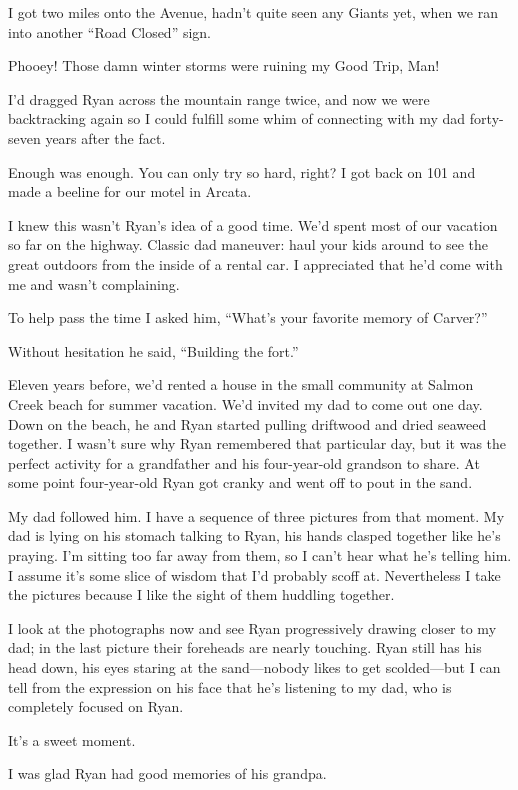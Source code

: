 \documentclass[12pt]{book}
\begin{document}
I got two miles onto the Avenue, hadn't quite seen any Giants yet, when we ran into another ``Road Closed'' sign.

Phooey! Those damn winter storms were ruining my Good Trip, Man!

I'd dragged Ryan across the mountain range twice, and now we were backtracking again so I could fulfill some whim of connecting with my dad forty-seven years after the fact.

Enough was enough. You can only try so hard, right? I got back on 101 and made a beeline for our motel in Arcata.

I knew this wasn't Ryan's idea of a good time. We'd spent most of our vacation so far on the highway. Classic dad maneuver: haul your kids around to see the great outdoors from the inside of a rental car. I appreciated that he'd come with me and wasn't complaining.

To help pass the time I asked him, ``What's your favorite memory of Carver?''

Without hesitation he said, ``Building the fort.''

Eleven years before, we'd rented a house in the small community at Salmon Creek beach for summer vacation. We'd invited my dad to come out one day. Down on the beach, he and Ryan started pulling driftwood and dried seaweed together. I wasn't sure why Ryan remembered that particular day, but it was the perfect activity for a grandfather and his four-year-old grandson to share. At some point four-year-old Ryan got cranky and went off to pout in the sand.

My dad followed him. I have a sequence of three pictures from that moment. My dad is lying on his stomach talking to Ryan, his hands clasped together like he's praying. I'm sitting too far away from them, so I can't hear what he's telling him. I assume it's some slice of wisdom that I'd probably scoff at. Nevertheless I take the pictures because I like the sight of them huddling together.

I look at the photographs now and see Ryan progressively drawing closer to my dad; in the last picture their foreheads are nearly touching. Ryan still has his head down, his eyes staring at the sand---nobody likes to get scolded---but I can tell from the expression on his face that he's listening to my dad, who is completely focused on Ryan.

It's a sweet moment.

I was glad Ryan had good memories of his grandpa.
\end{document}
